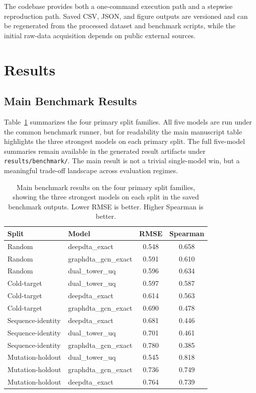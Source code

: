\documentclass[11pt]{article}
\begin{document}
The codebase provides both a one-command execution path and a stepwise
reproduction path. Saved CSV, JSON, and figure outputs are versioned and can be
regenerated from the processed dataset and benchmark scripts, while the initial
raw-data acquisition depends on public external sources.

\section{Results}

\subsection{Main Benchmark Results}

Table~\ref{tab:main-results} summarizes the four primary split families. All
five models are run under the common benchmark runner, but for readability the
main manuscript table highlights the three strongest models on each primary
split. The full five-model summaries remain available in the generated result
artifacts under \texttt{results/benchmark/}. The main result is not a trivial
single-model win, but a meaningful trade-off landscape across evaluation
regimes.

\begin{table}[H]
\centering
\caption{Main benchmark results on the four primary split families, showing the
three strongest models on each split in the saved benchmark outputs. Lower RMSE is
better. Higher Spearman is better.}
\label{tab:main-results}
\begin{tabular}{llcc}
\toprule
Split & Model & RMSE & Spearman \\
\midrule
Random & deepdta\_exact & 0.548 & 0.658 \\
Random & graphdta\_gcn\_exact & 0.591 & 0.610 \\
Random & dual\_tower\_uq & 0.596 & 0.634 \\
\midrule
Cold-target & dual\_tower\_uq & 0.597 & 0.587 \\
Cold-target & deepdta\_exact & 0.614 & 0.563 \\
Cold-target & graphdta\_gcn\_exact & 0.690 & 0.478 \\
\midrule
Sequence-identity & deepdta\_exact & 0.681 & 0.446 \\
Sequence-identity & dual\_tower\_uq & 0.701 & 0.461 \\
Sequence-identity & graphdta\_gcn\_exact & 0.780 & 0.385 \\
\midrule
Mutation-holdout & dual\_tower\_uq & 0.545 & 0.818 \\
Mutation-holdout & graphdta\_gcn\_exact & 0.736 & 0.749 \\
Mutation-holdout & deepdta\_exact & 0.764 & 0.739 \\
\bottomrule
\end{tabular}
\end{table}
\end{document}
